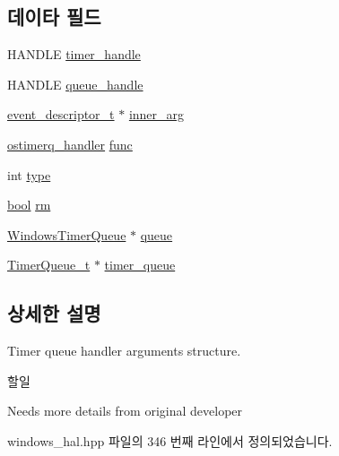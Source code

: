 \subsection*{데이타 필드}
\begin{DoxyCompactItemize}
\item 
H\+A\+N\+D\+LE \hyperlink{struct_windows_timer_queue_handler_arg_aaaeaf3320a1da4e9f80efbf95cbb0671}{timer\+\_\+handle}
\item 
H\+A\+N\+D\+LE \hyperlink{struct_windows_timer_queue_handler_arg_a0891fe4ac1705d165bbd1511a826cb6a}{queue\+\_\+handle}
\item 
\hyperlink{structevent__descriptor__t}{event\+\_\+descriptor\+\_\+t} $\ast$ \hyperlink{struct_windows_timer_queue_handler_arg_afc701b8a5b43cd1d29422c68856bc614}{inner\+\_\+arg}
\item 
\hyperlink{avbts__ostimerq_8hpp_ac7e0bdbe70d3e2951c02906cf4ed3aed}{ostimerq\+\_\+handler} \hyperlink{struct_windows_timer_queue_handler_arg_aaa1ebdc5351c8e4b6cd0b92aabfa4d52}{func}
\item 
int \hyperlink{struct_windows_timer_queue_handler_arg_ac765329451135abec74c45e1897abf26}{type}
\item 
\hyperlink{avb__gptp_8h_af6a258d8f3ee5206d682d799316314b1}{bool} \hyperlink{struct_windows_timer_queue_handler_arg_a059a8adfbb578bc50c97a96ae2ac0779}{rm}
\item 
\hyperlink{class_windows_timer_queue}{Windows\+Timer\+Queue} $\ast$ \hyperlink{struct_windows_timer_queue_handler_arg_a3aa628a0d9ac623a379f3bcaf5f937c3}{queue}
\item 
\hyperlink{struct_timer_queue__t}{Timer\+Queue\+\_\+t} $\ast$ \hyperlink{struct_windows_timer_queue_handler_arg_ae010a6908adeba19377ec504fe70f9cb}{timer\+\_\+queue}
\end{DoxyCompactItemize}


\subsection{상세한 설명}
Timer queue handler arguments structure. 

\begin{DoxyRefDesc}{할일}
\item[\hyperlink{todo__todo000026}{할일}]Needs more details from original developer \end{DoxyRefDesc}


windows\+\_\+hal.\+hpp 파일의 346 번째 라인에서 정의되었습니다.



